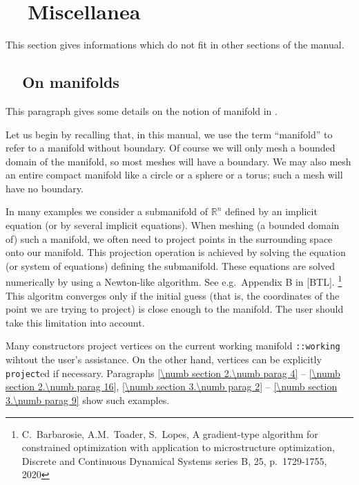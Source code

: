 
\chapter{~~Miscellanea}\label{\numb section 8}

This section gives informations which do not fit in other sections of the manual.


\section{~~On manifolds}\label{\numb section 8.\numb parag 1}

This paragraph gives some details on the notion of manifold in \maniFEM.

Let us begin by recalling that, in this manual, we use the term ``manifold'' to refer to
a manifold without boundary.
Of course we will only mesh a bounded domain of the manifold, so most meshes will have a boundary.
We may also mesh an entire compact manifold like a circle or a sphere or a torus;
such a mesh will have no boundary.

In many examples we consider a submanifold of $ \mathbb{R}^n $ defined by an implicit equation
(or by several implicit equations).
When meshing (a bounded domain of) such a manifold, we often need to project points in
the surrounding space onto our manifold. This projection operation is achieved by solving
the equation (or system of equations) defining the submanifold.
These equations are solved numerically by using a Newton-like algorithm.
See e.g.\ Appendix B in [BTL].%
\footnote{C.~Barbarosie, A.M.~Toader, S.~Lopes, A gradient-type algorithm for constrained
optimization with application to microstructure optimization, Discrete and Continuous Dynamical
Systems series B, 25, p.\ 1729-1755, 2020}
This algoritm converges only if the initial guess (that is, the coordinates of the point we are
trying to project) is close enough to the manifold.
The user should take this limitation into account.

Many {\small\tt{}} constructors project vertices on the current working manifold
{\small\tt{}::working} wihtout the user's assistance.
On the other hand, vertices can be explicitly {\small\tt project}ed if necessary.
Paragraphs \ref{\numb section 2.\numb parag 4} -- \ref{\numb section 2.\numb parag 16},
\ref{\numb section 3.\numb parag 2} -- \ref{\numb section 3.\numb parag 9} show such examples.


